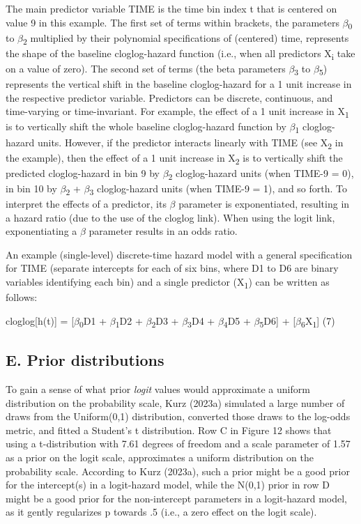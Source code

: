 \documentclass[
  man, donotrepeattitle,floatsintext]{apa6}
\begin{document}
The main predictor variable TIME is the time bin index t that is centered on value 9 in this example. The first set of terms within brackets, the parameters \(\beta\)\textsubscript{0} to \(\beta\)\textsubscript{2} multiplied by their polynomial specifications of (centered) time, represents the shape of the baseline cloglog-hazard function (i.e., when all predictors X\textsubscript{i} take on a value of zero). The second set of terms (the beta parameters \(\beta\)\textsubscript{3} to \(\beta\)\textsubscript{5}) represents the vertical shift in the baseline cloglog-hazard for a 1 unit increase in the respective predictor variable. Predictors can be discrete, continuous, and time-varying or time-invariant. For example, the effect of a 1 unit increase in X\textsubscript{1} is to vertically shift the whole baseline cloglog-hazard function by \(\beta\)\textsubscript{1} cloglog-hazard units. However, if the predictor interacts linearly with TIME (see X\textsubscript{2} in the example), then the effect of a 1 unit increase in X\textsubscript{2} is to vertically shift the predicted cloglog-hazard in bin 9 by \(\beta\)\textsubscript{2} cloglog-hazard units (when TIME-9 = 0), in bin 10 by \(\beta\)\textsubscript{2} + \(\beta\)\textsubscript{3} cloglog-hazard units (when TIME-9 = 1), and so forth. To interpret the effects of a predictor, its \(\beta\) parameter is exponentiated, resulting in a hazard ratio (due to the use of the cloglog link). When using the logit link, exponentiating a \(\beta\) parameter results in an odds ratio.

An example (single-level) discrete-time hazard model with a general specification for TIME (separate intercepts for each of six bins, where D1 to D6 are binary variables identifying each bin) and a single predictor (X\textsubscript{1}) can be written as follows:

\noindent cloglog{[}h(t){]} = {[}\(\beta\)\textsubscript{0}D1 + \(\beta\)\textsubscript{1}D2 + \(\beta\)\textsubscript{2}D3 + \(\beta\)\textsubscript{3}D4 + \(\beta\)\textsubscript{4}D5 + \(\beta\)\textsubscript{5}D6{]} + {[}\(\beta\)\textsubscript{6}X\textsubscript{1}{]} \hfill  (7)

\subsection{E. Prior distributions}\label{e.-prior-distributions}

To gain a sense of what prior \emph{logit} values would approximate a uniform distribution on the probability scale, Kurz (2023a) simulated a large number of draws from the Uniform(0,1) distribution, converted those draws to the log-odds metric, and fitted a Student's t distribution. Row C in Figure 12 shows that using a t-distribution with 7.61 degrees of freedom and a scale parameter of 1.57 as a prior on the logit scale, approximates a uniform distribution on the probability scale. According to Kurz (2023a), such a prior might be a good prior for the intercept(s) in a logit-hazard model, while the N(0,1) prior in row D might be a good prior for the non-intercept parameters in a logit-hazard model, as it gently regularizes p towards .5 (i.e., a zero effect on the logit scale).
\end{document}
